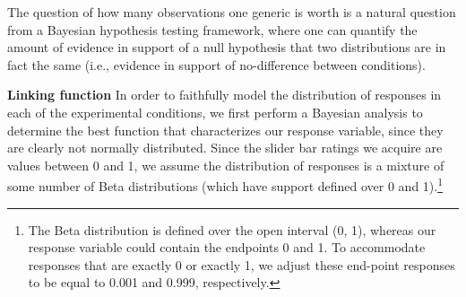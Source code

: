 \documentclass[10pt,letterpaper]{article}
\begin{document}
%



\begin{center}
  \begin{table}[h]
    \centering
    \caption{Experiment 1 model comparison. Bayes Factors in support of the hypothesis that the strength of generalization implied by a generic is equal to that of the experimental condition.}
    \label{tab:nobsBF}
  \end{table}
\end{center}

The question of how many observations one generic is worth is a natural question from a Bayesian hypothesis testing framework, where one can quantify the amount of evidence in support of a null hypothesis that two distributions are in fact the same (i.e., evidence in support of no-difference between conditions).

\noindent\textbf{Linking function}
In order to faithfully model the distribution of responses in each of the experimental conditions, we first perform a Bayesian analysis to determine the best function that characterizes our response variable, since they are clearly not normally distributed.
Since the slider bar ratings we acquire are values between 0 and 1, we assume the distribution of responses is a mixture of some number of Beta distributions (which have support defined over 0 and 1).\footnote{The Beta distribution is defined over the open interval (0, 1), whereas our response variable could contain the endpoints 0 and 1. To accommodate responses that are exactly 0 or exactly 1, we adjust these end-point responses to be equal to 0.001 and 0.999, respectively.}
\end{document}
